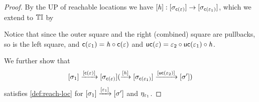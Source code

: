 \begin{proof}
    By the UP of reachable locations we have $[\mathit{h}] : [\sigma_{\mathsf{c}(\varepsilon)}] \to [\sigma_{\mathsf{c}(\varepsilon_1)}]$, which we extend to ${\mathbb{T}\mathbb{I}}$ by
    \begin{center}
    \end{center}
    Notice that since the outer square and the right (combined) square are pullbacks, so is the left square,
    and $\mathsf{c}(\varepsilon_1) = \mathit{h} \circ \mathsf{c}(\varepsilon)$ and $\mathsf{uc}(\varepsilon) = \varepsilon_2 \circ \mathsf{uc}(\varepsilon_1) \circ \mathit{h}$.

    We further show that
    \[ [\sigma_1] \xrightarrow{[\mathsf{c}(\varepsilon)]} [\sigma_{\mathsf{c}(\varepsilon)}] (\xrightarrow{[\mathit{h}]} [\sigma_{\mathsf{c}(\varepsilon_1)}] \xrightarrow{[\mathsf{uc}(\varepsilon_2)]} [\sigma']) \]
    satisfies \cref{def:reach-loc} for $[\sigma_1] \xrightarrow{[\varepsilon_1]} [\sigma']$ and $\eta_{\varepsilon_1}$.


\end{proof}
